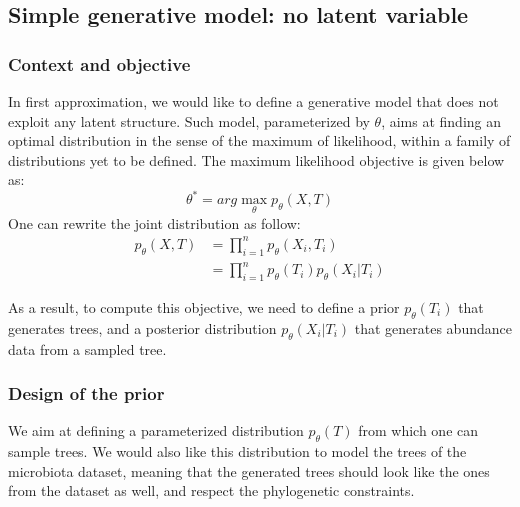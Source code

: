 \subsection{Simple generative model: no latent variable}

\subsubsection{Context and objective}

In first approximation, we would like to define a generative model that does not exploit any latent structure.
Such model, parameterized by $\theta$, aims at finding an optimal distribution in the sense of the maximum of likelihood,
within a family of distributions yet to be defined.
The maximum likelihood objective is given below as:
$$
\theta^* = arg\max_{\theta} p_{\theta}(X, T)
$$
One can rewrite the joint distribution as follow:
$$
\begin{align}
    p_{\theta}(X, T) &= \prod_{i=1}^n p_{\theta}(X_i, T_i) \\
                    &= \prod_{i=1}^n p_{\theta}(T_i) p_{\theta}(X_i | T_i)
\end{align}
$$

As a result, to compute this objective, we need to define a prior $p_{\theta}(T_i)$ that generates trees,
and a posterior distribution $p_{\theta}(X_i | T_i)$ that generates abundance data from a sampled tree.

\subsubsection{Design of the prior}

We aim at defining a parameterized distribution $p_{\theta}(T)$ from which one can sample trees.
We would also like this distribution to model the trees of the microbiota dataset, meaning that
the generated trees should look like the ones from the dataset as well, and respect the phylogenetic constraints. \\

